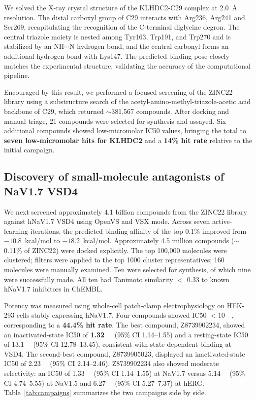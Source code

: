 \documentclass[11pt]{article}
\begin{document}
We solved the X-ray crystal structure of the KLHDC2-C29 complex at 2.0~\AA{} resolution. The distal carboxyl group of C29 interacts with Arg236, Arg241 and Ser269, recapitulating the recognition of the C-terminal diglycine degron. The central triazole moiety is nested among Tyr163, Trp191, and Trp270 and is stabilized by an NH$\cdots$N hydrogen bond, and the central carbonyl forms an additional hydrogen bond with Lys147. The predicted binding pose closely matches the experimental structure, validating the accuracy of the computational pipeline.

Encouraged by this result, we performed a focused screening of the ZINC22 library using a substructure search of the acetyl-amino-methyl-triazole-acetic acid backbone of C29, which returned $\sim$381{,}567 compounds. After docking and manual triage, 21 compounds were selected for synthesis and assayed. Six additional compounds showed low-micromolar IC50 values, bringing the total to \textbf{seven low-micromolar hits for KLHDC2} and a \textbf{14\% hit rate} relative to the initial campaign.

\subsection{Discovery of small-molecule antagonists of NaV1.7 VSD4}
We next screened approximately 4.1 billion compounds from the ZINC22 library against hNaV1.7 VSD4 using OpenVS and VSX mode. Across seven active-learning iterations, the predicted binding affinity of the top 0.1\% improved from $-10.8$~kcal/mol to $-18.2$~kcal/mol. Approximately 4.5 million compounds ($\sim$0.11\% of ZINC22) were docked explicitly. The top 100{,}000 molecules were clustered; filters were applied to the top 1000 cluster representatives; 160 molecules were manually examined. Ten were selected for synthesis, of which nine were successfully made. All ten had Tanimoto similarity $<$ 0.33 to known hNaV1.7 inhibitors in ChEMBL.

Potency was measured using whole-cell patch-clamp electrophysiology on HEK-293 cells stably expressing hNaV1.7. Four compounds showed IC50 $< 10$~\si{\micro\molar}, corresponding to a \textbf{44.4\% hit rate}. The best compound, Z8739902234, showed an inactivated-state IC50 of \textbf{1.32~\si{\micro\molar}} (95\% CI 1.14--1.55) and a resting-state IC50 of 13.1~\si{\micro\molar} (95\% CI 12.78--13.45), consistent with state-dependent binding at VSD4. The second-best compound, Z8739905023, displayed an inactivated-state IC50 of 2.23~\si{\micro\molar} (95\% CI 2.14--2.46). Z8739902234 also showed moderate selectivity: an IC50 of 1.33~\si{\micro\molar} (95\% CI 1.14--1.55) at NaV1.7 versus 5.14~\si{\micro\molar} (95\% CI 4.74--5.55) at NaV1.5 and 6.27~\si{\micro\molar} (95\% CI 5.27--7.37) at hERG. Table~\ref{tab:campaigns} summarizes the two campaigns side by side.
\end{document}
